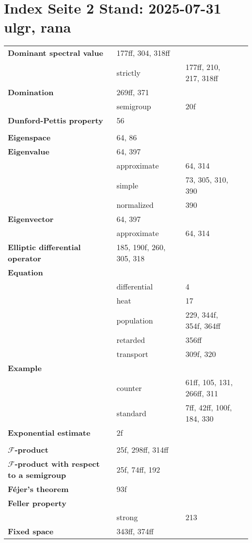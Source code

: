 \documentclass[10pt]{scrartcl}
\newcommand{\F}{\mathcal{F}}
\begin{document}
\pagestyle{empty}
\section*{Index Seite 2 Stand: 2025-07-31 ulgr, rana}

\begin{longtable}{>{\bfseries}p{4cm}p{4cm}p{4cm}p{4cm}}

Dominant spectral value 	& 177ff, 304, 318ff \\
	& strictly 	& 177ff, 210, 217, 318ff \\
Domination 	& 269ff, 371 \\
	& semigroup 	& 20f \\
Dunford-Pettis property 	& 56 \\
	& \\
Eigenspace 	& 64, 86 \\
Eigenvalue 	& 64, 397 \\
	& approximate 	& 64, 314 \\
	& simple 	& 73, 305, 310, 390 \\
	& normalized 	& 390 \\
Eigenvector 	& 64, 397 \\
	& approximate 	& 64, 314 \\
Elliptic differential \mbox{operator} 	& 185, 190f, 260, 305, 318 \\
Equation 	& \\
	& differential 	& 4 \\
	& heat 	& 17 \\
	& population 	& 229, 344f, 354f, 364ff \\
	& retarded 	& 356ff \\
	& transport 	& 309f, 320 \\
Example 	& \\
	& counter 	& 61ff, 105, 131, 266ff, 311 \\
	& standard 	& 7ff, 42ff, 100f, 184, 330\\
Exponential estimate 	& 2f \\
	& \\
$\F$-product 	& 25f, 298ff, 314ff \\
$\F$-product with respect to a semigroup 	& 25f, 74ff, 192 \\
Féjer's theorem 	& 93f \\
Feller property 	& \\
	& strong 	& 213 \\
Fixed space 	& 343ff, 374ff \\

\end{longtable}
\end{document}
